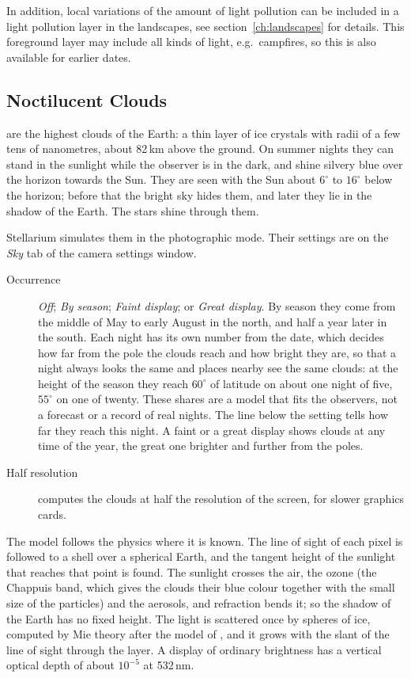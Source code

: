 In addition, local variations of
the amount of light pollution can be included in a light pollution
layer in the landscapes, see
section~\ref{ch:landscapes} for details. This foreground layer may include 
all kinds of light, e.g.\  campfires, so this is also available for earlier 
dates.


\subsection{Noctilucent Clouds}
\label{sec:phenomena:NoctilucentClouds}

 are the highest clouds of the Earth: a
thin layer of ice crystals with radii of a few tens of nanometres,
about 82\,km above the ground. On summer nights they can stand in
the sunlight while the observer is in the dark, and shine silvery blue
over the horizon towards the Sun. They are seen with the Sun about
$6^\circ$ to $16^\circ$ below the horizon; before that the bright sky
hides them, and later they lie in the shadow of the Earth. The stars
shine through them.

Stellarium simulates them in the photographic mode. Their settings are
on the \emph{Sky} tab of the camera settings window.

\begin{description}
\item[Occurrence] \emph{Off}; \emph{By season}; \emph{Faint display};
  or \emph{Great display}. By season they come from the middle of May
  to early August in the north, and half a year later in the south.
  Each night has its own number from the date, which decides how far
  from the pole the clouds reach and how bright they are, so that
  a night always looks the same and places nearby see the same clouds:
  at the height of the season they reach $60^\circ$ of latitude on about
  one night of five, $55^\circ$ on one of twenty. These shares
  are a model that fits the observers, not a forecast or a record
  of real nights. The line below the setting tells how far they reach
  this night. A faint or a great display shows clouds at any time of
  the year, the great one brighter and further from the poles.
\item[Half resolution] computes the clouds at half the resolution of
  the screen, for slower graphics cards.
\end{description}

The model follows the physics where it is known. The line of sight of
each pixel is followed to a shell over a spherical Earth, and the
tangent height of the sunlight that reaches that point is found. The
sunlight crosses the air, the ozone (the Chappuis band, which gives the
clouds their blue colour together with the small size of the particles)
and the aerosols, and refraction bends it; so the shadow of the Earth
has no fixed height. The light is scattered once by spheres of
ice, computed by Mie theory after the model of
\citet{Lange:2022:NLCColour}, and it grows with the slant of the line
of sight through the layer. A display of ordinary brightness
has a vertical optical depth of about $10^{-5}$ at 532\,nm.

